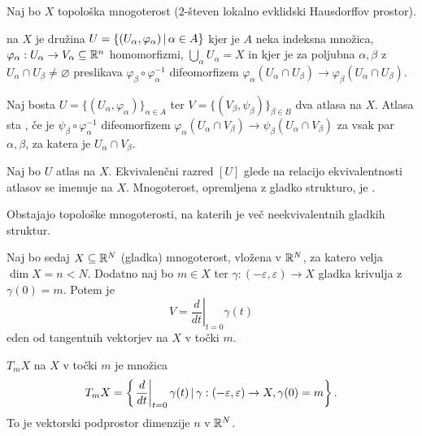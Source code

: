 
Naj bo $X$ topološka mnogoterost ($2$-števen lokalno evklidski Hausdorffov
prostor).

\begin{definicija}
   na $X$ je družina $U = \{ (U_\alpha, \varphi_\alpha)
  \,|\, \alpha \in A \}$ kjer je $A$ neka indeksna množica,
  $\varphi_\alpha : U_\alpha \to V_\alpha \subseteq \mathbb{R}^n$ homomorfizmi,
  $\bigcup_\alpha U_\alpha = X$ in kjer je za poljubna $\alpha, \beta$ z
  $U_\alpha \cap U_\beta \ne \varnothing$ preslikava $\varphi_\beta \circ
  \varphi_\alpha^{-1}$ difeomorfizem $\varphi_\alpha(U_\alpha \cap U_\beta) \to
  \varphi_\beta(U_\alpha \cap U_\beta)$.
\end{definicija}

\begin{definicija}
  Naj bosta $U = \{(U_\alpha, \varphi_\alpha)\}_{\alpha \in A}$ ter $V =
  \{(V_\beta, \psi_\beta)\}_{\beta \in B}$ dva atlasa na $X$. Atlasa sta
  , če je $\psi_\beta \circ \varphi_\alpha^{-1}$
  difeomorfizem $\varphi_\alpha(U_\alpha \cap V_\beta) \to \psi_\beta(U_\alpha
  \cap V_\beta)$ za vsak par $\alpha, \beta$, za katera je $U_\alpha \cap
  V_\beta$.
\end{definicija}

\begin{definicija}
  Naj bo $U$ atlas na $X$.
  Ekvivalenčni razred $[U]$ glede na relacijo ekvivalentnosti atlasov se imenuje
   na $X$.
  Mnogoterost, opremljena z gladko strukturo, je .
\end{definicija}

\begin{opomba}
  Obstajajo topološke mnogoterosti, na katerih je več neekvivalentnih gladkih
  struktur.
\end{opomba}

Naj bo sedaj $X \subseteq \mathbb{R}^N$ (gladka) mnogoterost, vložena v $\mathbb{R}^N$, za
katero velja $\dim X = n < N$.
Dodatno naj bo $m \in X$ ter $\gamma: (-\varepsilon, \varepsilon) \to X$ gladka
krivulja z $\gamma(0) = m$.
Potem je
\[
  V = \left. \frac{d}{dt} \right|_{t=0} \gamma(t)
\]
eden od tangentnih vektorjev na $X$ v točki $m$.

\begin{definicija}
   $T_m X$ na $X$ v točki $m$ je množica
  \[
	T_m X = \left\{ \left. \frac{d}{dt} \right|_{t=0} \gamma(t) \,|\, \gamma:
	  (-\varepsilon, \varepsilon) \to X, \gamma(0) = m \right\}.
  \]
  To je vektorski podprostor dimenzije $n$ v $\mathbb{R}^N$.
\end{definicija}

